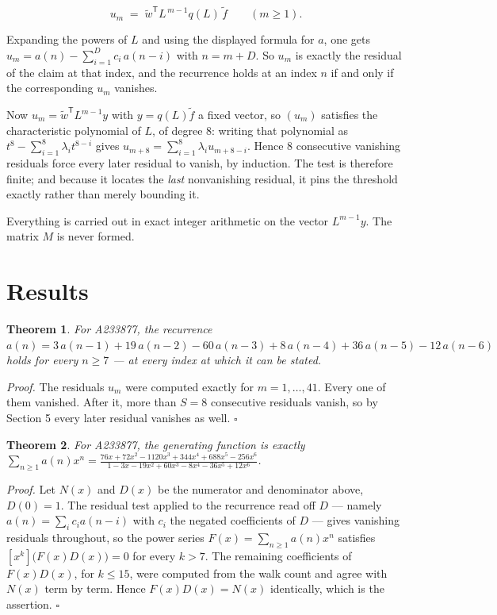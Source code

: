 \documentclass[11pt]{article}
\newtheorem{theorem}{Theorem}
\theoremstyle{definition}
\begin{document}
\[u_m \;=\; \tilde w^{\mathsf T} L^{\,m-1} q(L)\,\tilde f \qquad (m \ge 1).\]

Expanding the powers of $L$ and using the displayed formula for $a$, one gets $u_m = a(n) - \sum_{i=1}^{D} c_i\,a(n-i)$ with $n = m + D$. So $u_m$ is exactly the residual of the claim at that index, and the recurrence holds at an index $n$ if and only if the corresponding $u_m$ vanishes.

Now $u_m = \tilde w^{\mathsf T} L^{m-1} y$ with $y = q(L)\tilde f$ a fixed vector, so $(u_m)$ satisfies the characteristic polynomial of $L$, of degree $8$: writing that polynomial as $t^{8} - \sum_{i=1}^{8} \lambda_i t^{8-i}$ gives $u_{m+8} = \sum_{i=1}^{8} \lambda_i u_{m+8-i}$. Hence $8$ consecutive vanishing residuals force every later residual to vanish, by induction. The test is therefore finite; and because it locates the {\itshape last} nonvanishing residual, it pins the threshold exactly rather than merely bounding it.

Everything is carried out in exact integer arithmetic on the vector $L^{m-1}y$. The matrix $M$ is never formed.

\section{Results}

\begin{theorem} For A233877, the recurrence $a(n) = 3\,a(n-1) + 19\,a(n-2) - 60\,a(n-3) + 8\,a(n-4) + 36\,a(n-5) - 12\,a(n-6)$ holds for every $n \ge 7$ --- at every index at which it can be stated.\end{theorem}

{\itshape Proof.} The residuals $u_m$ were computed exactly for $m = 1,\dots,41$. Every one of them vanished. After it, more than $S = 8$ consecutive residuals vanish, so by Section 5 every later residual vanishes as well. $\square$

\begin{theorem} For A233877, the generating function is exactly $\sum_{n\ge 1} a(n)x^n = \frac{76x + 72x^{2} - 1120x^{3} + 344x^{4} + 688x^{5} - 256x^{6}}{1 - 3x - 19x^{2} + 60x^{3} - 8x^{4} - 36x^{5} + 12x^{6}}$.\end{theorem}

{\itshape Proof.} Let $N(x)$ and $D(x)$ be the numerator and denominator above, $D(0)=1$. The residual test applied to the recurrence read off $D$ --- namely $a(n) = \sum_i c_i a(n-i)$ with $c_i$ the negated coefficients of $D$ --- gives vanishing residuals throughout, so the power series $F(x)=\sum_{n\ge 1}a(n)x^n$ satisfies $[x^k]\bigl(F(x)D(x)\bigr) = 0$ for every $k > 7$. The remaining coefficients of $F(x)D(x)$, for $k \le 15$, were computed from the walk count and agree with $N(x)$ term by term. Hence $F(x)D(x) = N(x)$ identically, which is the assertion. $\square$
\end{document}
